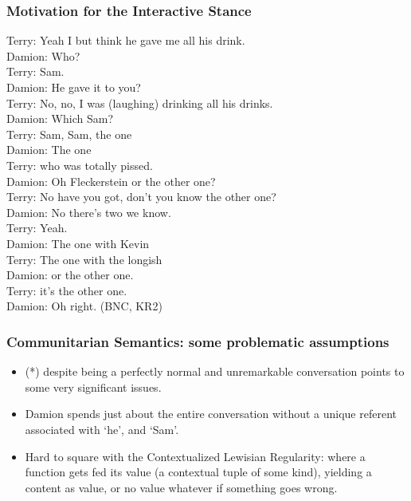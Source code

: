 \documentclass{beamer}
\begin{document}
\begin{frame}[label=Samex]
\frametitle{Motivation for  the Interactive Stance}

 
{\footnotesize
Terry:             Yeah I but think he gave me all his drink. \\
 Damion:             \textcolor[rgb]{0.98,0.00,0.00}{Who?} \\
 Terry:             \textcolor[rgb]{0.00,0.00,0.98}{Sam.} \\
 Damion:             He gave it to you? \\
 Terry:             \textcolor[rgb]{0.00,0.00,0.98}{No, no}, I was (laughing) drinking all his drinks.\\
 Damion:             \textcolor[rgb]{0.98,0.00,0.00}{Which Sam?} \\
 Terry:             Sam, Sam, the one \\
 Damion:             The one \\
 Terry:             who was totally pissed. \\
 Damion:              \textcolor[rgb]{0.98,0.00,0.00}{Oh Fleckerstein or the other one?} \\
 Terry:             No have you got, don't you know the other one? \\
 Damion:              No there's two we know. \\
 Terry:             \textcolor[rgb]{0.00,0.00,0.98}{Yeah.} \\
 Damion:             \textcolor[rgb]{0.00,0.00,0.98}{The one with Kevin} \\
 Terry:              The one with the longish \\
 Damion:             or the other one. \\
 Terry:             it's the other one. \\
 Damion:             \textcolor[rgb]{0.00,0.00,0.98}{Oh right.} (BNC, KR2)
}

\hfill\hyperlink{eqa}{}
\end{frame}

\begin{frame}[label=eqa]
\frametitle{Communitarian Semantics: some
    problematic assumptions}

\begin{itemize}

\item (*) despite being a perfectly normal and unremarkable
conversation points to some very significant issues.

\item Damion spends just about the entire
conversation without a unique referent associated with `he', and `Sam'.

\item Hard to square with
the {\sf Contextualized Lewisian Regularity}: where a function gets
fed its value (a contextual tuple of some kind), yielding a content as
value, or no value whatever if something goes wrong.

\end{itemize}

\end{frame}
\end{document}
